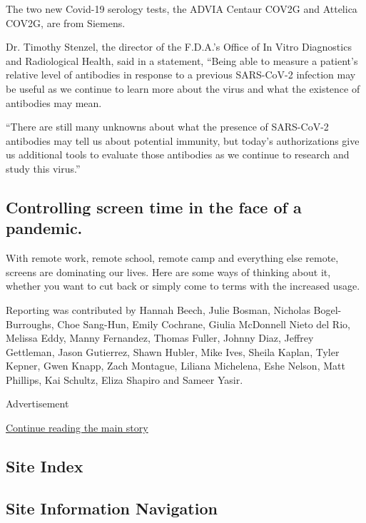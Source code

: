 The two new Covid-19 serology tests, the ADVIA Centaur COV2G and
Attelica COV2G, are from Siemens.

Dr. Timothy Stenzel, the director of the F.D.A.'s Office of In Vitro
Diagnostics and Radiological Health, said in a statement, ``Being able
to measure a patient's relative level of antibodies in response to a
previous SARS-CoV-2 infection may be useful as we continue to learn more
about the virus and what the existence of antibodies may mean.

``There are still many unknowns about what the presence of SARS-CoV-2
antibodies may tell us about potential immunity, but today's
authorizations give us additional tools to evaluate those antibodies as
we continue to research and study this virus.''

\hypertarget{controlling-screen-time-in-the-face-of-a-pandemic}{%
\subsection{Controlling screen time in the face of a
pandemic.}\label{controlling-screen-time-in-the-face-of-a-pandemic}}

With remote work, remote school, remote camp and everything else remote,
screens are dominating our lives. Here are some ways of thinking about
it, whether you want to cut back or simply come to terms with the
increased usage.

Reporting was contributed by Hannah Beech, Julie Bosman, Nicholas
Bogel-Burroughs, Choe Sang-Hun, Emily Cochrane, Giulia McDonnell Nieto
del Rio, Melissa Eddy, Manny Fernandez, Thomas Fuller, Johnny Diaz,
Jeffrey Gettleman, Jason Gutierrez, Shawn Hubler, Mike Ives, Sheila
Kaplan, Tyler Kepner, Gwen Knapp, Zach Montague, Liliana Michelena, Eshe
Nelson, Matt Phillips, Kai Schultz, Eliza Shapiro and Sameer Yasir.

Advertisement

\protect\hyperlink{after-bottom}{Continue reading the main story}

\hypertarget{site-index}{%
\subsection{Site Index}\label{site-index}}

\hypertarget{site-information-navigation}{%
\subsection{Site Information
Navigation}\label{site-information-navigation}}

